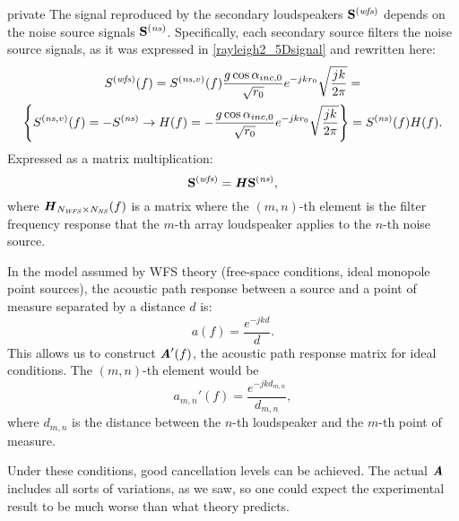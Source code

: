 \begin{shownto}{private}
The signal reproduced by the secondary loudspeakers $\vec{\signal[wfs][frequency]}$ depends on the noise source signals $\vec{\signal[ns][frequency]}$. Specifically, each secondary source filters the noise source signals, as it was expressed in \autoref{rayleigh2_5Dsignal} and rewritten here:
\begin{multline}
\signal[wfs][frequency](f) = \signal[nsVirt][frequency](f) \frac{g \cos\normPrimaryPropAngleSection}{\sqrt{\distLinePrimSource}}
e^{-j k \distLinePrimSource} \sqrt{\frac{jk}{2\pi}} = \\
\left\{
\signal[nsVirt][frequency](f) = -\signal[ns][frequency] \rightarrow
H(f) = -\frac{g \cos\normPrimaryPropAngleSection}{\sqrt{\distLinePrimSource}}
e^{-j k \distLinePrimSource} \sqrt{\frac{jk}{2\pi}}
\right\} = \signal[ns][frequency](f) H(f).
\end{multline}
Expressed as a matrix multiplication:
\begin{equation}
\vec{\signal[wfs][frequency]} = \myMatrix{H} \vec{\signal[ns][frequency]},
\end{equation}
where $\bm{\mathit{H}}_{N_\mathit{WFS} \times N_\mathit{NS}}(f)$ is a matrix where the $(m,n)$-th element is the filter frequency response that the $m$-th array loudspeaker applies to the $n$-th noise source.

In the model assumed by WFS theory (free-space conditions, ideal monopole point sources), the acoustic path response between a source and a point of measure separated by a distance $d$ is:
\begin{equation}
a(f) = \frac{e^{-j k d}}{d}.
\end{equation}
This allows us to construct $\AcPath[mat]'(f)$, the acoustic path response matrix for ideal conditions. The $(m,n)$-th element would be 
\begin{equation}
a_{m,n}'(f) = \frac{e^{-j k d_{m,n}}}{d_{m,n}},
\end{equation}
where $d_{m,n}$ is the distance between the $n$-th loudspeaker and the $m$-th point of measure.

Under these conditions, good cancellation levels can be achieved. The actual $\AcPath[mat]$ includes all sorts of variations, as we saw, so one could expect the experimental result to be much worse than what theory predicts.
\end{shownto}

